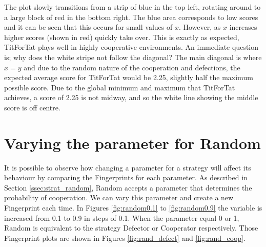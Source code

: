 The plot slowly transitions from a strip of blue in the top left, rotating around to a large block of red in the bottom right.
The blue area corresponds to low scores and it can be seen that this occurs for small values of $x$.
However, as $x$ increases higher scores (shown in red) quickly take over.
This is exactly as expected, TitForTat plays well in highly cooperative environments.
An immediate question is; why does the white stripe not follow the diagonal?
The main diagonal is where $x=y$ and due to the random nature of the cooperation and defections, the expected average score for TitForTat would be 2.25, slightly half the maximum possible score.
Due to the global minimum and maximum that TitForTat achieves, a score of 2.25 is not midway, and so the white line showing the middle score is off centre.



\section{Varying the parameter for Random}

It is possible to observe how changing a parameter for a strategy will affect its behaviour by comparing the Fingerprints for each parameter.
As described in Section \ref{ssec:strat_random}, Random accepts a parameter that determines the probability of cooperation.
We can vary this parameter and create a new Fingerprint each time.{}
In Figures \ref{fig:random0.1} to \ref{fig:random0.9} the variable is increased from 0.1 to 0.9 in steps of 0.1.
When the parameter equal 0 or 1, Random is equivalent to the strategy Defector or Cooperator respectively.
Those Fingerprint plots are shown in Figures \ref{fig:rand_defect} and \ref{fig:rand_coop}.


